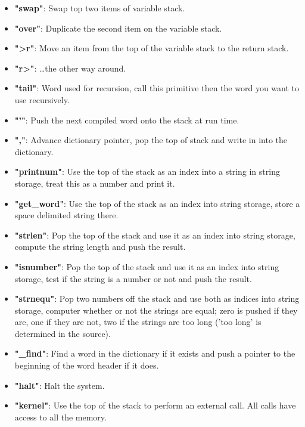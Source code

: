 \documentclass	[a4paper, 10pt]	{article}
\begin{document}
\begin{itemize}
        \item \textbf{"swap"}: Swap top two items of variable stack.
        \item \textbf{"over"}: Duplicate the second item on the variable stack. 
        \item \textbf{">r"}: Move an item from the top of the variable
        stack to the return stack.
        \item \textbf{"r>"}: \ldots the other way around.
        \item \textbf{"tail"}: Word used for recursion, call this primitive
        then the word you want to use recursively.
        \item \textbf{"'"}: Push the next compiled word onto the stack at
        run time.
        \item \textbf{","}: Advance dictionary pointer, pop the top of stack
        and write in into the dictionary.
        \item \textbf{"printnum"}: Use the top of the stack as an index into
        a string in string storage, treat this as a number and print it.
        \item \textbf{"get\_word"}: Use the top of the stack as an index into
        string storage, store a space delimited string there.
        \item \textbf{"strlen"}: Pop the top of the stack and use it as an index
        into string storage, compute the string length and push the result.
        \item \textbf{"isnumber"}: Pop the top of the stack and use it as an index
        into string storage, test if the string is a number or not and push the
        result.
        \item \textbf{"strnequ"}: Pop two numbers off the stack and use both
        as indices into string storage, computer whether or not the strings are
        equal; zero is pushed if they are, one if they are not, two if the strings
        are too long ('too long' is determined in the source).
        \item \textbf{"\_find"}: Find a word in the dictionary if it
        exists and push a pointer to the beginning of the word header if
        it does.
        \item \textbf{"halt"}: Halt the system.
        \item \textbf{"kernel"}: Use the top of the stack to perform an
        external call. All calls have access to all the memory.
      \end{itemize}
\end{document}
